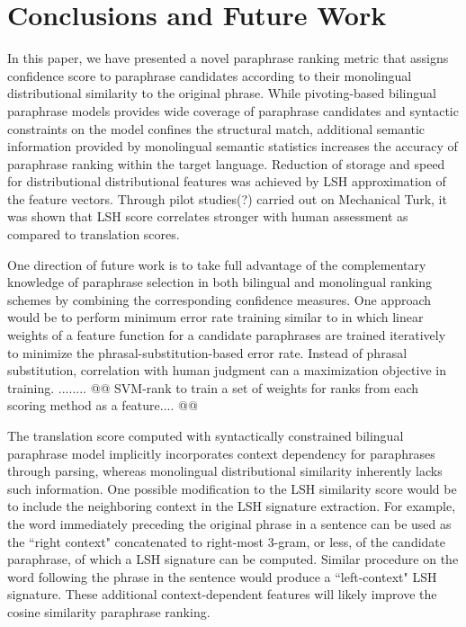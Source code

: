 \documentclass[11pt]{article}
\begin{document}
\section{Conclusions and Future Work}
In this paper, we have presented a novel paraphrase ranking metric that assigns confidence score to paraphrase candidates according to their monolingual distributional similarity to the original phrase. While pivoting-based bilingual paraphrase models provides wide coverage of paraphrase candidates and syntactic constraints on the model confines the structural match, additional semantic information provided by monolingual semantic statistics increases the accuracy of paraphrase ranking within the target language. Reduction of storage and speed for distributional distributional features was achieved by LSH approximation of the feature vectors. Through pilot studies(?) carried out on Mechanical Turk, it was shown that LSH score correlates stronger with human assessment as compared to translation scores.

One direction of future work is to take full advantage of the complementary knowledge of paraphrase selection in both bilingual and monolingual ranking schemes by combining the corresponding confidence measures. One approach would be to perform minimum error rate training similar to  in which linear weights of a feature function for a candidate paraphrases are trained iteratively to minimize the phrasal-substitution-based error rate. Instead of phrasal substitution, correlation with human judgment can a maximization objective in training. ........ @@ SVM-rank to train a set of weights for ranks from each scoring method as a feature.... @@ 

The translation score computed with syntactically constrained bilingual paraphrase model implicitly incorporates context dependency for paraphrases through parsing, whereas monolingual distributional similarity inherently lacks such information. One possible modification to the LSH similarity score would be to include the neighboring context in the LSH signature extraction. For example, the word immediately preceding the original phrase in a sentence can be used as the ``right context" concatenated to right-most 3-gram, or less, of the candidate paraphrase, of which a LSH signature can be computed. Similar procedure on the word following the phrase in the sentence would produce a ``left-context" LSH signature. These additional context-dependent features will likely improve the cosine similarity paraphrase ranking.
\end{document}
